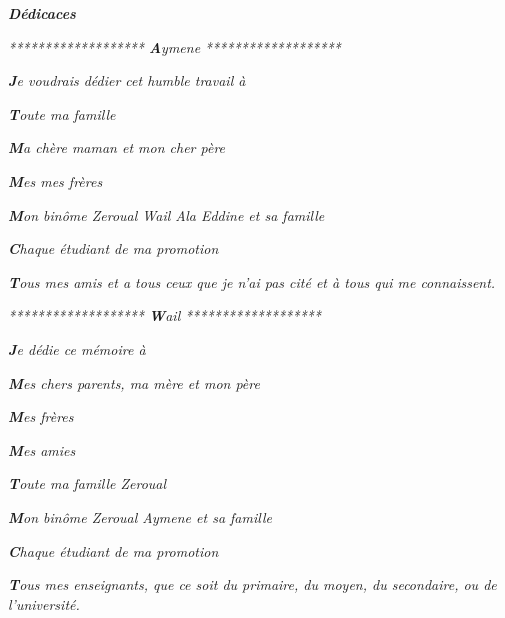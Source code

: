 \newpage
\thispagestyle{empty}
\begin{center}
\textcolor[rgb]{0,0,1}{{\Huge\textbf{\textit{Dédicaces}}}}
\end{center}

\vspace{1 cm}

\begin{center}
\textcolor[rgb]{0,0,1}{\textit{******************* \hspace{0.5 cm}\LARGE{\textbf{A}ymene}} \hspace{0.5 cm}  \textit{*******************}}

\textit{\textbf{J}e voudrais dédier cet humble travail à}

\textit{\textbf{T}oute ma famille}

\textit{\textbf{M}a chère maman et mon cher père} 

\textit{\textbf{M}es mes frères}
  
\textit{\textbf{M}on binôme Zeroual Wail Ala Eddine et sa famille}

\textit{\textbf{C}haque étudiant de ma promotion} 

\textit{\textbf{T}ous mes amis et a tous ceux que je n’ai pas cité et à tous qui me connaissent.}
\end{center}

\vspace{1.5 cm}

\begin{center}
\textcolor[rgb]{0,0,1}{\textit{******************* \hspace{0.5 cm}\LARGE{\textbf{W}ail}} \hspace{0.5 cm}  \textit{*******************}}

\textit{\textbf{J}e dédie ce mémoire à}

\textit{\textbf{M}es chers parents, ma mère et mon père}

\textit{\textbf{M}es frères}

\textit{\textbf{M}es amies}

\textit{\textbf{T}oute ma famille Zeroual}
  
\textit{\textbf{M}on binôme Zeroual Aymene et sa famille}

\textit{\textbf{C}haque étudiant de ma promotion} 

\textit{\textbf{T}ous mes enseignants, que ce soit du primaire, du moyen, du secondaire, ou de l'université.}
\end{center}




